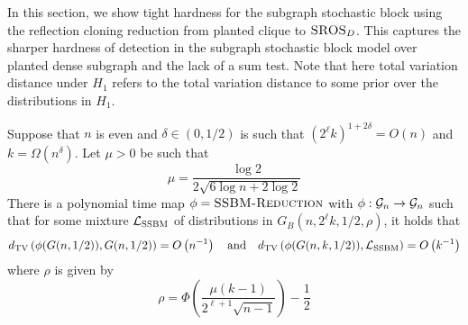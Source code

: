 In this section, we show tight hardness for the subgraph stochastic block using the reflection cloning reduction from planted clique to $\textsc{SROS}_D$. This captures the sharper hardness of detection in the subgraph stochastic block model over planted dense subgraph and the lack of a sum test. Note that here total variation distance under $H_1$ refers to the total variation distance to some prior over the distributions in $H_1$.

\begin{lemma} \label{lem:ssbm}
Suppose that $n$ is even and $\delta \in (0, 1/2)$ is such that $(2^{\ell}k)^{1 + 2\delta} = O(n)$ and $k = \Omega\left(n^\delta\right)$. Let $\mu > 0$ be such that
$$\mu = \frac{\log 2}{2 \sqrt{6 \log n + 2\log 2}}$$
There is a polynomial time map $\phi = \textsc{SSBM-Reduction}$ with $\phi : \mathcal{G}_n \to \mathcal{G}_n$ such that for some mixture $\mathcal{L}_{\textsc{SSBM}}$ of distributions in $G_B\left(n, 2^\ell k, 1/2, \rho \right)$, it holds that
$$d_{\text{TV}}\left( \phi(G(n, 1/2)), G(n, 1/2) \right) = O\left(n^{-1} \right) \quad \text{and} \quad d_{\text{TV}}\left( \phi(G(n, k, 1/2)), \mathcal{L}_{\text{SSBM}}\right) = O\left( k^{-1} \right)$$
where $\rho$ is given by
$$\rho = \Phi\left( \frac{\mu(k - 1)}{2^{\ell + 1}\sqrt{n- 1}} \right) - \frac{1}{2}$$
\end{lemma}

